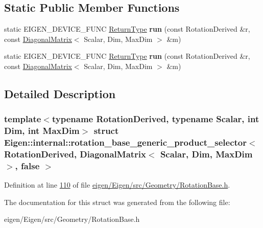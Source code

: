 \subsection*{Static Public Member Functions}
\begin{DoxyCompactItemize}
\item 
\mbox{\label{struct_eigen_1_1internal_1_1rotation__base__generic__product__selector_3_01_rotation_derived_00_7e855ad9d8f41d04ee2e0f10c5040984_af4fa0ba69413fd6ba05f27353436d1d3}} 
static E\+I\+G\+E\+N\+\_\+\+D\+E\+V\+I\+C\+E\+\_\+\+F\+U\+NC \hyperlink{group___geometry___module_class_eigen_1_1_transform}{Return\+Type} {\bfseries run} (const Rotation\+Derived \&r, const \hyperlink{group___core___module_class_eigen_1_1_diagonal_matrix}{Diagonal\+Matrix}$<$ Scalar, Dim, Max\+Dim $>$ \&m)
\item 
\mbox{\label{struct_eigen_1_1internal_1_1rotation__base__generic__product__selector_3_01_rotation_derived_00_7e855ad9d8f41d04ee2e0f10c5040984_af4fa0ba69413fd6ba05f27353436d1d3}} 
static E\+I\+G\+E\+N\+\_\+\+D\+E\+V\+I\+C\+E\+\_\+\+F\+U\+NC \hyperlink{group___geometry___module_class_eigen_1_1_transform}{Return\+Type} {\bfseries run} (const Rotation\+Derived \&r, const \hyperlink{group___core___module_class_eigen_1_1_diagonal_matrix}{Diagonal\+Matrix}$<$ Scalar, Dim, Max\+Dim $>$ \&m)
\end{DoxyCompactItemize}


\subsection{Detailed Description}
\subsubsection*{template$<$typename Rotation\+Derived, typename Scalar, int Dim, int Max\+Dim$>$\newline
struct Eigen\+::internal\+::rotation\+\_\+base\+\_\+generic\+\_\+product\+\_\+selector$<$ Rotation\+Derived, Diagonal\+Matrix$<$ Scalar, Dim, Max\+Dim $>$, false $>$}



Definition at line \hyperlink{eigen_2_eigen_2src_2_geometry_2_rotation_base_8h_source_l00110}{110} of file \hyperlink{eigen_2_eigen_2src_2_geometry_2_rotation_base_8h_source}{eigen/\+Eigen/src/\+Geometry/\+Rotation\+Base.\+h}.



The documentation for this struct was generated from the following file\+:\begin{DoxyCompactItemize}
\item 
eigen/\+Eigen/src/\+Geometry/\+Rotation\+Base.\+h\end{DoxyCompactItemize}
